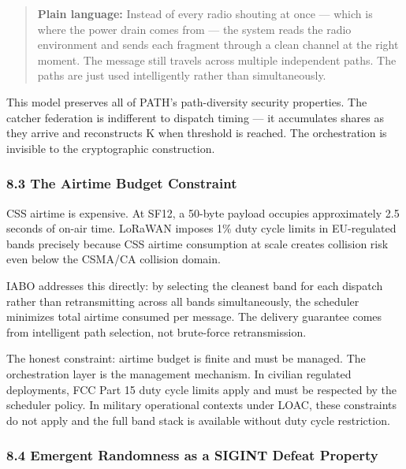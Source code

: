 \documentclass[
  11pt,
]{article}
\begin{document}
\begin{quote}
\textbf{Plain language:} Instead of every radio shouting at once ---
which is where the power drain comes from --- the system reads the radio
environment and sends each fragment through a clean channel at the right
moment. The message still travels across multiple independent paths. The
paths are just used intelligently rather than simultaneously.
\end{quote}

This model preserves all of PATH's path-diversity security properties.
The catcher federation is indifferent to dispatch timing --- it
accumulates shares as they arrive and reconstructs K when threshold is
reached. The orchestration is invisible to the cryptographic
construction.

\hypertarget{the-airtime-budget-constraint}{%
\subsubsection{8.3 The Airtime Budget
Constraint}\label{the-airtime-budget-constraint}}

CSS airtime is expensive. At SF12, a 50-byte payload occupies
approximately 2.5 seconds of on-air time. LoRaWAN imposes 1\% duty cycle
limits in EU-regulated bands precisely because CSS airtime consumption
at scale creates collision risk even below the CSMA/CA collision domain.

IABO addresses this directly: by selecting the cleanest band for each
dispatch rather than retransmitting across all bands simultaneously, the
scheduler minimizes total airtime consumed per message. The delivery
guarantee comes from intelligent path selection, not brute-force
retransmission.

The honest constraint: airtime budget is finite and must be managed. The
orchestration layer is the management mechanism. In civilian regulated
deployments, FCC Part 15 duty cycle limits apply and must be respected
by the scheduler policy. In military operational contexts under LOAC,
these constraints do not apply and the full band stack is available
without duty cycle restriction.

\hypertarget{emergent-randomness-as-a-sigint-defeat-property}{%
\subsubsection{8.4 Emergent Randomness as a SIGINT Defeat
Property}\label{emergent-randomness-as-a-sigint-defeat-property}}
\end{document}
